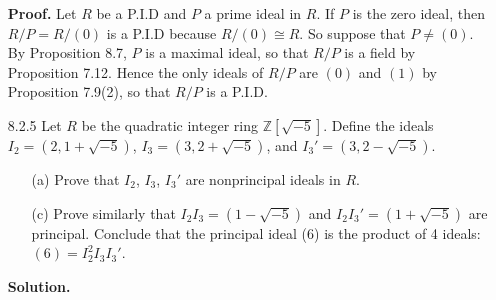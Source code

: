 \documentclass[9pt]{article}
\newcommand{\Z}{\mathbb{Z}}
\begin{document}
\begin{enumerate}
      \textbf{Proof.} Let $R$ be a P.I.D and $P$ a prime ideal in $R$. If $P$ is
      the zero ideal, then $R/P = R/(0)$ is a P.I.D because $R/(0) \cong R$. So
      suppose that $P \neq (0)$. By Proposition 8.7, $P$ is a maximal ideal, so
      that $R/P$ is a field by Proposition 7.12. Hence the only ideals of $R/P$
      are $(0)$ and $(1)$ by Proposition 7.9(2), so that $R/P$ is a P.I.D.
   \item[8.2.5]   Let $R$ be the quadratic integer ring $\Z[\sqrt{-5}]$. Define
                  the ideals $I_2 = (2, 1 + \sqrt{-5})$,
                  $I_3 = (3, 2 + \sqrt{-5})$, and $I_3' = (3, 2 - \sqrt{-5})$.
                  \begin{enumerate}
                     \item[(a)]  Prove that $I_2$, $I_3$, $I_3'$ are
                                 nonprincipal ideals in $R$.
                     \item[(c)]  Prove similarly that $I_2I_3 = (1-\sqrt{-5})$ 
                                 and $I_2I_3' = (1 + \sqrt{-5})$ are principal. 
                                 Conclude that the principal ideal (6) is the 
                                 product of 4 ideals: $(6) = I_2^2I_3I_3'$.
                  \end{enumerate}

      \textbf{Solution.}


\end{enumerate}
\end{document}
